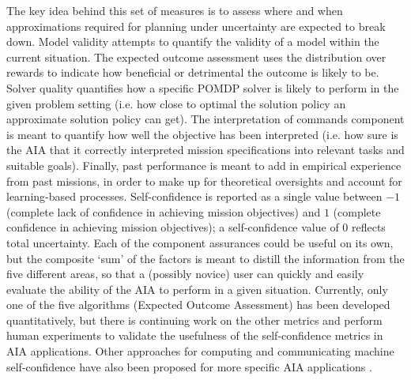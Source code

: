 The key idea behind this set of measures is to assess where and when approximations required for planning under uncertainty are expected to break down. Model validity attempts to quantify the validity of a model within the current situation. The expected outcome assessment uses the distribution over rewards to indicate how beneficial or detrimental the outcome is likely to be. Solver quality quantifies how a specific POMDP solver is likely to perform in the given problem setting (i.e. how close to optimal the solution policy an approximate solution policy can get). 
The interpretation of commands component is meant to quantify how well the objective has been interpreted (i.e. how sure is the AIA that it correctly interpreted mission specifications into relevant tasks and suitable goals). 
Finally, past performance is meant to add in empirical experience from past missions, in order to make up for theoretical oversights and account for learning-based processes. 
Self-confidence is reported as a single value between $-1$ (complete lack of confidence in achieving mission objectives) and $1$ (complete confidence in achieving mission objectives); a self-confidence value of $0$ reflects total uncertainty. 
Each of the component assurances could be useful on its own, but the composite `sum' of the factors is meant to distill the information from the five different areas, so that a (possibly novice) user can quickly and easily evaluate the ability of the AIA to perform in a given situation. 
Currently, only one of the five algorithms (Expected Outcome Assessment) has been developed quantitatively, but there is continuing work on the other metrics and perform human experiments to validate the usefulness of the self-confidence metrics in AIA applications. Other approaches for computing and communicating machine self-confidence have also been proposed for more specific AIA applications \cite{Hutchins-HFES-2015, Kaipa-AAAI-2015, Zagorecki-AAAI-2015, Kuter2015-qh}. 

